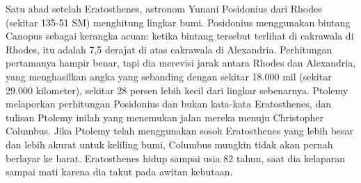 Satu abad setelah Eratosthenes, astronom Yunani Posidonius dari Rhodes (sekitar 135-51 SM) menghitung lingkar bumi. Posidonius menggunakan bintang Canopus sebagai kerangka acuan: ketika bintang tersebut terlihat di cakrawala di Rhodes, itu adalah 7,5 derajat di atas cakrawala di Alexandria. Perhitungan pertamanya hampir benar, tapi dia merevisi jarak antara Rhodes dan Alexandria, yang menghasilkan angka yang sebanding dengan sekitar 18.000 mil (sekitar 29.000 kilometer), sekitar 28 persen lebih kecil dari lingkar sebenarnya. Ptolemy melaporkan perhitungan Posidonius dan bukan kata-kata Eratosthenes, dan tulisan Ptolemy inilah yang menemukan jalan mereka menuju Christopher Columbus. Jika Ptolemy telah menggunakan sosok Eratosthenes yang lebih besar dan lebih akurat untuk keliling bumi, Columbus mungkin tidak akan pernah berlayar ke barat.
Eratosthenes hidup sampai usia 82 tahun, saat dia kelaparan sampai mati karena dia takut pada awitan kebutaan.
